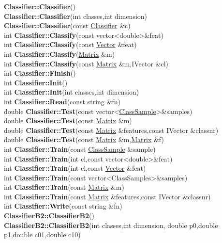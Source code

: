 \documentclass[10pt,titlepage]{article}
\def\functionlistentry#1#2#3#4#5#6{\noindent #1 {\bf #2}(#3) \dotfill #6\\}
\def\letterref#1{}
\def\letterlabelend#1{}
\begin{document}
{{\letterref{Ca}
\letterref{Ce}
\letterref{Ch}
\letterref{Ci}
\letterref{Cl}
\letterref{Co}
\letterref{Cr}
\letterref{Cu}
\letterlabelend{Cl}
\functionlistentry{}{Classifier::Classifier}{}{942}{classification}{}
\functionlistentry{}{Classifier::Classifier}{int classes,int dimension}{943}{classification}{}
\functionlistentry{}{Classifier::Classifier}{const \hyperlink{Classifier}{Classifier} \&c}{944}{classification}{}
\functionlistentry{int}{Classifier::Classify}{const vector\textless {}double\textgreater  \&feat}{958}{classification}{}
\functionlistentry{int}{Classifier::Classify}{const \hyperlink{Vector}{Vector} \&feat}{959}{classification}{}
\functionlistentry{int}{Classifier::Classify}{\hyperlink{Matrix}{Matrix} \&m}{960}{classification}{}
\functionlistentry{int}{Classifier::Classify}{const \hyperlink{Matrix}{Matrix} \&m,IVector \&cl}{961}{classification}{}
\functionlistentry{int}{Classifier::Finish}{}{953}{classification}{}
\functionlistentry{int}{Classifier::Init}{}{945}{classification}{}
\functionlistentry{int}{Classifier::Init}{int classes,int dimension}{946}{classification}{}
\functionlistentry{int}{Classifier::Read}{const string \&fn}{963}{classification}{}
\functionlistentry{double}{Classifier::Test}{const vector\textless {}\hyperlink{ClassSample}{ClassSample}\textgreater  \&samples}{954}{classification}{}
\functionlistentry{double}{Classifier::Test}{const \hyperlink{Matrix}{Matrix} \&m}{955}{classification}{}
\functionlistentry{double}{Classifier::Test}{const \hyperlink{Matrix}{Matrix} \&features,const IVector \&classnr}{956}{classification}{}
\functionlistentry{double}{Classifier::Test}{const \hyperlink{Matrix}{Matrix} \&m,\hyperlink{Matrix}{Matrix} \&f}{957}{classification}{}
\functionlistentry{int}{Classifier::Train}{const \hyperlink{ClassSample}{ClassSample} \&sample}{947}{classification}{}
\functionlistentry{int}{Classifier::Train}{int cl,const vector\textless {}double\textgreater  \&feat}{948}{classification}{}
\functionlistentry{int}{Classifier::Train}{int cl,const \hyperlink{Vector}{Vector} \&feat}{949}{classification}{}
\functionlistentry{int}{Classifier::Train}{const vector\textless {}ClassSamples\textgreater  \&samples}{950}{classification}{}
\functionlistentry{int}{Classifier::Train}{const \hyperlink{Matrix}{Matrix} \&m}{951}{classification}{}
\functionlistentry{int}{Classifier::Train}{const \hyperlink{Matrix}{Matrix} \&features,const IVector \&classnr}{952}{classification}{}
\functionlistentry{int}{Classifier::Write}{const string \&fn}{962}{classification}{}
\functionlistentry{}{ClassifierB2::ClassifierB2}{}{978}{classification}{}
\functionlistentry{}{ClassifierB2::ClassifierB2}{int classes,int dimension, double p0,double p1,double c01,double c10}{979}{classification}{}
}}
\end{document}
